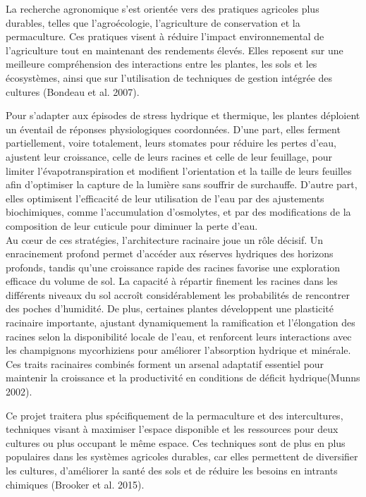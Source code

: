 \documentclass[
]{article}
\begin{document}
\hfill\break
La recherche agronomique s'est orientée vers des pratiques agricoles
plus durables, telles que l'agroécologie, l'agriculture de conservation
et la permaculture. Ces pratiques visent à réduire l'impact
environnemental de l'agriculture tout en maintenant des rendements
élevés. Elles reposent sur une meilleure compréhension des interactions
entre les plantes, les sols et les écosystèmes, ainsi que sur
l'utilisation de techniques de gestion intégrée des cultures (Bondeau et
al. 2007).

Pour s'adapter aux épisodes de stress hydrique et thermique, les plantes
déploient un éventail de réponses physiologiques coordonnées. D'une
part, elles ferment partiellement, voire totalement, leurs stomates pour
réduire les pertes d'eau, ajustent leur croissance, celle de leurs
racines et celle de leur feuillage, pour limiter l'évapotranspiration et
modifient l'orientation et la taille de leurs feuilles afin d'optimiser
la capture de la lumière sans souffrir de surchauffe. D'autre part,
elles optimisent l'efficacité de leur utilisation de l'eau par des
ajustements biochimiques, comme l'accumulation d'osmolytes, et par des
modifications de la composition de leur cuticule pour diminuer la perte
d'eau.\\
Au cœur de ces stratégies, l'architecture racinaire joue un rôle
décisif. Un enracinement profond permet d'accéder aux réserves hydriques
des horizons profonds, tandis qu'une croissance rapide des racines
favorise une exploration efficace du volume de sol. La capacité à
répartir finement les racines dans les différents niveaux du sol accroît
considérablement les probabilités de rencontrer des poches d'humidité.
De plus, certaines plantes développent une plasticité racinaire
importante, ajustant dynamiquement la ramification et l'élongation des
racines selon la disponibilité locale de l'eau, et renforcent leurs
interactions avec les champignons mycorhiziens pour améliorer
l'absorption hydrique et minérale. Ces traits racinaires combinés
forment un arsenal adaptatif essentiel pour maintenir la croissance et
la productivité en conditions de déficit hydrique(Munns 2002).

\hfill\break
Ce projet traitera plus spécifiquement de la permaculture et des
intercultures, techniques visant à maximiser l'espace disponible et les
ressources pour deux cultures ou plus occupant le même espace. Ces
techniques sont de plus en plus populaires dans les systèmes agricoles
durables, car elles permettent de diversifier les cultures, d'améliorer
la santé des sols et de réduire les besoins en intrants chimiques
(Brooker et al. 2015).
\end{document}
